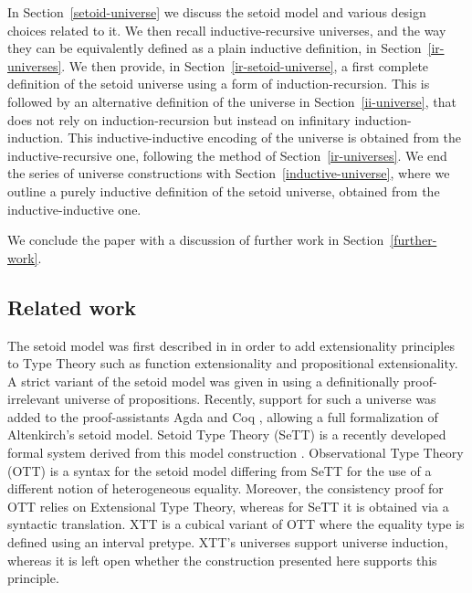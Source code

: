 \documentclass{easychair}
\begin{document}
In Section~\ref{setoid-universe} we discuss the setoid model and various design
choices related to it. We then recall inductive-recursive universes, and the way
they can be equivalently defined as a plain inductive definition, in
Section~\ref{ir-universes}.
%
We then provide, in Section~\ref{ir-setoid-universe}, a first complete
definition of the setoid universe using a form of induction-recursion. This is
followed by an alternative definition of the universe in
Section~\ref{ii-universe}, that does not rely on induction-recursion but instead
on infinitary induction-induction. This inductive-inductive encoding of the
universe is obtained from the inductive-recursive one, following the method of
Section~\ref{ir-universes}.
%
We end the series of universe constructions with
Section~\ref{inductive-universe}, where we outline a purely inductive definition
of the setoid universe, obtained from the inductive-inductive one.

We conclude the paper with a discussion of further work in
Section~\ref{further-work}.

\subsection{Related work}

The setoid model was first described in \cite{hofmann} in order to add
extensionality principles to Type Theory such as function extensionality and
propositional extensionality. A strict variant of the setoid model was given in
\cite{setoid99} using a definitionally proof-irrelevant universe of
propositions. Recently, support for such a universe was added to the
proof-assistants Agda and Coq \cite{agda-prop}, allowing a full formalization of
Altenkirch's setoid model. Setoid Type Theory (SeTT) is a recently developed
formal system derived from this model construction \cite{mpc19}. Observational
Type Theory (OTT) \cite{alti:ott-conf, alti:ott-conf} is a syntax for the setoid
model differing from SeTT for the use of a different notion of heterogeneous
equality. Moreover, the consistency proof for OTT relies on Extensional Type
Theory, whereas for SeTT it is obtained via a syntactic translation.
%
XTT \cite{xtt} is a cubical variant of OTT where the equality type is defined
using an interval pretype. XTT's universes support universe induction, whereas
it is left open whether the construction presented here supports this principle.
\end{document}

